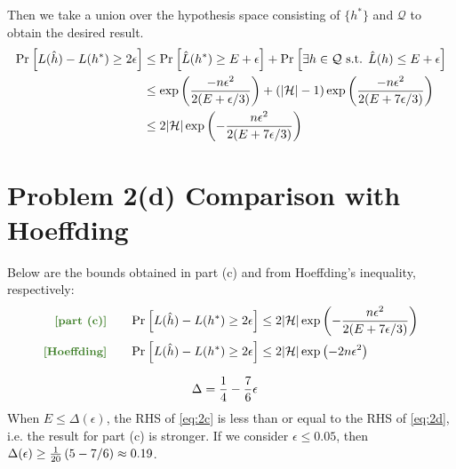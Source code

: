 \documentclass[11pt]{article}
\newcommand{\1}{\mathbb{I}} %
\begin{document}
Then we take a union over the hypothesis space consisting of $\{ h^*\}$ and $\mathcal Q$ to obtain the desired result. 
\begin{align}
	\text{Pr}_{}\left[ L(\hat h) - L(h^*) \geq 2 \epsilon \right] 
		&\leq \text{Pr}_{}\left[ \hat L(h^*) \geq E + \epsilon \right] 
			+ \text{Pr}_{}\left[ \exists h \in \mathcal Q \text { s.t. } \hat L (h) \leq E + \epsilon \right] \\
		&\leq \exp\left(    \frac{ -n\epsilon^2  }{ 2(E + \epsilon/ 3) }   \right)  
			+  \left(  | \mathcal H| - 1  \right)\exp\left(    \frac{ -n\epsilon^2  }{ 2(E +7 \epsilon/ 3) }   \right) \\
		&\leq 2 | \mathcal H | \exp\left(  
			- \frac{n \epsilon^2}{2 (E + 7\epsilon / 3) }
		 \right)
\end{align}

\begin{comment}
For compactness, let $\Delta(h) = L(h) - \hat L(h)$. Then
\begin{align}
	\Prob{L(\hat h) - L(h^*) \geq 2 \epsilon}
	&\leq \Prob{ |\Delta(h^*)| + \sup_{h \in \mathcal H} \Delta(h)  \geq 2 \epsilon } \\
	&\leq \Prob{ |\Delta(h^*)| \geq \epsilon  } + \Prob{  \sup_{h \in \mathcal H} \Delta(h)  \geq  \epsilon  } \\
	&\leq  \Prob{ |\Delta(h^*)| \geq \epsilon  }  + \sum_{h \in \mathcal H} \Prob{ \hat L(h)  \leq E + \epsilon  } \\
	&\leq P_a + P_b
\end{align}
\end{comment}



\clearpage 
\section*{Problem 2(d) Comparison with Hoeffding}

Below are the bounds obtained in part (c) and from Hoeffding's inequality, respectively:
\begin{align}
	\mtgreen{[part (c)]}\qquad 
		\Prob{ L(\hat h) - L(h^*) \geq 2 \epsilon } 
		&\leq 2 | \mathcal H | \exp\lr{ 
			- \frac{n \epsilon^2}{2 (E + 7\epsilon / 3) } } \label{eq:2c}  \\
		\mtgreen{[Hoeffding]}\qquad 
	\Prob{ L(\hat h) - L(h^*) \geq 2\epsilon  }
&\leq 2 | \mathcal H | \exp \lr{  -2n\epsilon^2  } \label{eq:2d}
\end{align}

\begin{align}
	\Delta 
		&= \frac{1}{4} - \frac{7}{6} \epsilon 
\end{align}
When $E \leq \Delta(\epsilon)$, the RHS of \ref{eq:2c} is less than or equal to the RHS of \ref{eq:2d}, i.e. the result for part (c) is stronger. If we consider $\epsilon \leq 0.05$, then $\Delta(\epsilon) \geq \frac{1}{20}\left(  5 - 7/6  \right) \approx 0.19$.
\end{document}
